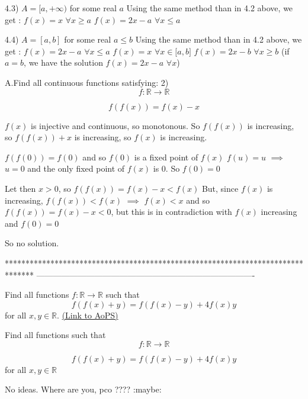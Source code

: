 \begin{solution}
4.3) $ A=[a,+\infty)$ for some real $ a$
Using the same method than in 4.2 above, we get :
$ f(x)=x$ $ \forall x\geq a$
$ f(x)=2x-a$ $ \forall x\leq a$

4.4) $ A=[a,b]$ for some real $ a\leq b$
Using the same method than in 4.2 above, we get :
$ f(x)=2x-a$ $ \forall x\leq a$
$ f(x)=x$ $ \forall x\in\mathbb[a,b]$
$ f(x)=2x-b$ $ \forall x\geq b$
(if $ a=b$, we have the solution $ f(x)=2x-a$ $ \forall x$)
\end{solution}



\begin{solution}
	\begin{tcolorbox}A.Find all continuous  functions satisfying:
2)
\[ f: \mathbb R \to \mathbb R
\]

\[ f(f(x)) = f(x) - x
\]
\end{tcolorbox}

$ f(x)$ is injective and continuous, so monotonous.
So $ f(f(x))$ is increasing, so $ f(f(x))+x$ is increasing, so $ f(x)$ is increasing.

$ f(f(0))=f(0)$ and so $ f(0)$ is a fixed point of $ f(x)$
$ f(u)=u$ $ \implies$ $ u=0$ and the only fixed point of $ f(x)$ is $ 0$. So $ f(0)=0$

Let then $ x>0$, so $ f(f(x))=f(x)-x<f(x)$
But, since $ f(x)$ is increasing, $ f(f(x))<f(x)$ $ \implies$ $ f(x)<x$ and so $ f(f(x))=f(x)-x<0$, but this is in contradiction with $ f(x)$ increasing and $ f(0)=0$

So no solution.
\end{solution}
*******************************************************************************
-------------------------------------------------------------------------------

\begin{problem}
	Find all functions $f: \mathbb  R\to \mathbb R$ such that
\[ f(f(x) + y) = f(f(x) - y) + 4f(x)y
\]
for all $ x,y \in \mathbb R$.
	\flushright \href{https://artofproblemsolving.com/community/c6h284036}{(Link to AoPS)}
\end{problem}



\begin{solution}
	\begin{tcolorbox}Find all functions such that
\[ f: \mathbb R\to \mathbb R\]

\[ f(f(x) + y) = f(f(x) - y) + 4f(x)y\]
for all $ x,y \in \mathbb R$\end{tcolorbox}
No ideas. Where are you, pco ???? :maybe:
\end{solution}




